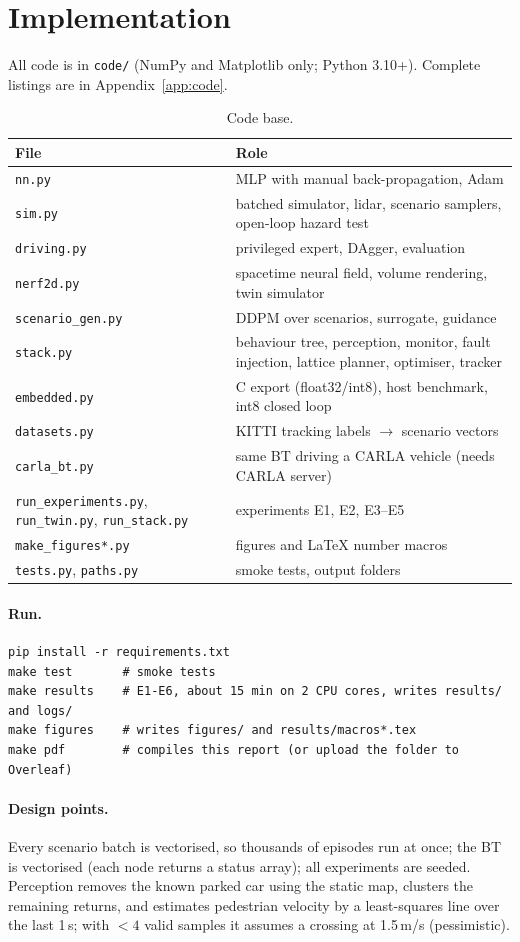 \section{Implementation}
All code is in \texttt{code/} (NumPy and Matplotlib only; Python 3.10+). Complete listings are in Appendix~\ref{app:code}.
\begin{table}[H]\centering\small
\begin{tabularx}{\linewidth}{lY}\toprule
File & Role\\\midrule
\texttt{nn.py} & MLP with manual back-propagation, Adam\\
\texttt{sim.py} & batched simulator, lidar, scenario samplers, open-loop hazard test\\
\texttt{driving.py} & privileged expert, DAgger, evaluation\\
\texttt{nerf2d.py} & spacetime neural field, volume rendering, twin simulator\\
\texttt{scenario\_gen.py} & DDPM over scenarios, surrogate, guidance\\
\texttt{stack.py} & behaviour tree, perception, monitor, fault injection, lattice planner, optimiser, tracker\\
\texttt{embedded.py} & C export (float32/int8), host benchmark, int8 closed loop\\
\texttt{datasets.py} & KITTI tracking labels $\to$ scenario vectors\\
\texttt{carla\_bt.py} & same BT driving a CARLA vehicle (needs CARLA server)\\
\texttt{run\_experiments.py}, \texttt{run\_twin.py}, \texttt{run\_stack.py} & experiments E1, E2, E3--E5\\
\texttt{make\_figures*.py} & figures and LaTeX number macros\\
\texttt{tests.py}, \texttt{paths.py} & smoke tests, output folders\\\bottomrule
\end{tabularx}
\caption{Code base.}
\end{table}
\paragraph{Run.}
\begin{lstlisting}[style=plain]
pip install -r requirements.txt
make test       # smoke tests
make results    # E1-E6, about 15 min on 2 CPU cores, writes results/ and logs/
make figures    # writes figures/ and results/macros*.tex
make pdf        # compiles this report (or upload the folder to Overleaf)
\end{lstlisting}
\paragraph{Design points.} Every scenario batch is vectorised, so thousands of episodes run at once; the BT is vectorised (each node returns a status array); all experiments are seeded. Perception removes the known parked car using the static map, clusters the remaining returns, and estimates pedestrian velocity by a least-squares line over the last 1\,s; with $<4$ valid samples it assumes a crossing at 1.5\,m/s (pessimistic).
